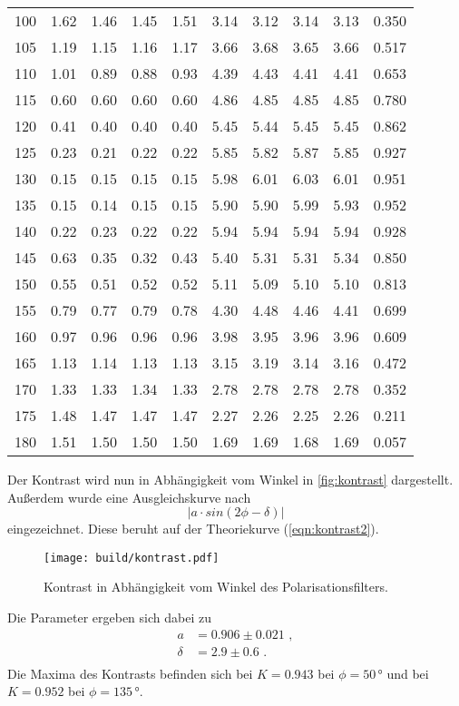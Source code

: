 \begin{sidewaystable}
\begin{tabular}{c c c c c c c c c c}
    100& 1.62 & 1.46 & 1.45 & 1.51 & 3.14 & 3.12 & 3.14 & 3.13 & 0.350 \\
    105& 1.19 & 1.15 & 1.16 & 1.17 & 3.66 & 3.68 & 3.65 & 3.66 & 0.517 \\
    110& 1.01 & 0.89 & 0.88 & 0.93 & 4.39 & 4.43 & 4.41 & 4.41 & 0.653 \\
    115& 0.60 & 0.60 & 0.60 & 0.60 & 4.86 & 4.85 & 4.85 & 4.85 & 0.780 \\
    120& 0.41 & 0.40 & 0.40 & 0.40 & 5.45 & 5.44 & 5.45 & 5.45 & 0.862 \\
    125& 0.23 & 0.21 & 0.22 & 0.22 & 5.85 & 5.82 & 5.87 & 5.85 & 0.927 \\
    130& 0.15 & 0.15 & 0.15 & 0.15 & 5.98 & 6.01 & 6.03 & 6.01 & 0.951 \\
    135& 0.15 & 0.14 & 0.15 & 0.15 & 5.90 & 5.90 & 5.99 & 5.93 & 0.952 \\
    140& 0.22 & 0.23 & 0.22 & 0.22 & 5.94 & 5.94 & 5.94 & 5.94 & 0.928 \\
    145& 0.63 & 0.35 & 0.32 & 0.43 & 5.40 & 5.31 & 5.31 & 5.34 & 0.850 \\
    150& 0.55 & 0.51 & 0.52 & 0.52 & 5.11 & 5.09 & 5.10 & 5.10 & 0.813 \\
    155& 0.79 & 0.77 & 0.79 & 0.78 & 4.30 & 4.48 & 4.46 & 4.41 & 0.699 \\
    160& 0.97 & 0.96 & 0.96 & 0.96 & 3.98 & 3.95 & 3.96 & 3.96 & 0.609 \\
    165& 1.13 & 1.14 & 1.13 & 1.13 & 3.15 & 3.19 & 3.14 & 3.16 & 0.472 \\
    170& 1.33 & 1.33 & 1.34 & 1.33 & 2.78 & 2.78 & 2.78 & 2.78 & 0.352 \\
    175& 1.48 & 1.47 & 1.47 & 1.47 & 2.27 & 2.26 & 2.25 & 2.26 & 0.211 \\
    180& 1.51 & 1.50 & 1.50 & 1.50 & 1.69 & 1.69 & 1.68 & 1.69 & 0.057 \\
    \bottomrule
    \end{tabular}
    \label{tab:kontrast}
\end{sidewaystable}
Der Kontrast wird nun in Abhängigkeit vom Winkel in \autoref{fig:kontrast} dargestellt. Außerdem wurde eine Ausgleichskurve nach 
\begin{equation*}
    \lvert a \cdot sin(2\phi -\delta) \rvert
\end{equation*}
eingezeichnet. Diese beruht auf der Theoriekurve (\autoref{eqn:kontrast2}).
\begin{figure}
    \centering
    \texttt{[image: build/kontrast.pdf]}
    \caption{Kontrast in Abhängigkeit vom Winkel des Polarisationsfilters.}
    \label{fig:kontrast}
\end{figure}
Die Parameter ergeben sich dabei zu 
\begin{align*}
    a &= 0.906 \pm 0.021 \, \, ,\\
    \delta &= 2.9 \pm 0.6 \, \, .\\
\end{align*}
Die Maxima des Kontrasts befinden sich bei $K=0.943$ bei $\phi=50\,°$ und bei $K=0.952$ bei $\phi = 135\, °$.

